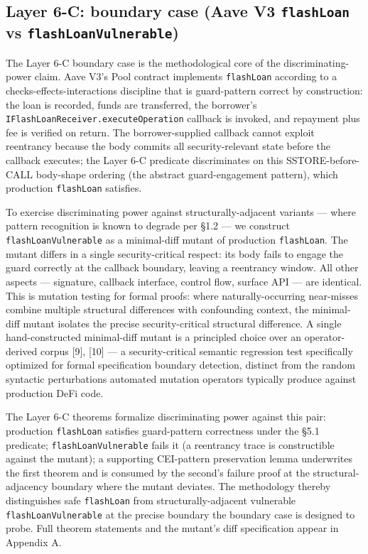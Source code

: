 \subsection{\texorpdfstring{Layer 6-C: boundary case (Aave V3
\texttt{flashLoan} vs
\texttt{flashLoanVulnerable})}{Layer 6-C: boundary case (Aave V3 flashLoan vs flashLoanVulnerable)}}\label{layer-6-c-boundary-case-aave-v3-flashloan-vs-flashloanvulnerable}

The Layer 6-C boundary case is the methodological core of the
discriminating-power claim. Aave V3's Pool contract implements
\texttt{flashLoan} according to a checks-effects-interactions discipline
that is guard-pattern correct by construction: the loan is recorded,
funds are transferred, the borrower's
\texttt{IFlashLoanReceiver.executeOperation} callback is invoked, and
repayment plus fee is verified on return. The borrower-supplied callback
cannot exploit reentrancy because the body commits all security-relevant
state before the callback executes; the Layer 6-C predicate
discriminates on this SSTORE-before-CALL body-shape ordering (the
abstract guard-engagement pattern), which production \texttt{flashLoan}
satisfies.

To exercise discriminating power against structurally-adjacent variants
--- where pattern recognition is known to degrade per §1.2 --- we
construct \texttt{flashLoanVulnerable} as a minimal-diff mutant of
production \texttt{flashLoan}. The mutant differs in a single
security-critical respect: its body fails to engage the guard correctly
at the callback boundary, leaving a reentrancy window. All other aspects
--- signature, callback interface, control flow, surface API --- are
identical. This is mutation testing for formal proofs: where
naturally-occurring near-misses combine multiple structural differences
with confounding context, the minimal-diff mutant isolates the precise
security-critical structural difference. A single hand-constructed
minimal-diff mutant is a principled choice over an operator-derived
corpus {[}9{]}, {[}10{]} --- a security-critical semantic regression
test specifically optimized for formal specification boundary detection,
distinct from the random syntactic perturbations automated mutation
operators typically produce against production DeFi code.

The Layer 6-C theorems formalize discriminating power against this pair:
production \texttt{flashLoan} satisfies guard-pattern correctness under
the §5.1 predicate; \texttt{flashLoanVulnerable} fails it (a reentrancy
trace is constructible against the mutant); a supporting CEI-pattern
preservation lemma underwrites the first theorem and is consumed by the
second's failure proof at the structural-adjacency boundary where the
mutant deviates. The methodology thereby distinguishes safe
\texttt{flashLoan} from structurally-adjacent vulnerable
\texttt{flashLoanVulnerable} at the precise boundary the boundary case
is designed to probe. Full theorem statements and the mutant's diff
specification appear in Appendix A.

